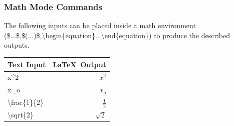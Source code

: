 \documentclass{beamer}
\begin{document}
\begin{frame}
	\frametitle{Math Mode Commands}
The following inputs can be placed inside a math environment (\$...\$,\$(...)\$,\textbackslash begin\{equation\}...\textbackslash end\{equation\}) to produce the described outputs.
\begin{center}
	\begin{tabular}{ l r }
		Text Input & \LaTeX\ Output\\
		\hline
		x\^{}2 & $x^{2}$ \\ 
		x\_o & $x_o$ \\ 
		\textbackslash frac\{1\}\{2\} & $\frac{1}{2}$ \\ 
		\textbackslash sqrt\{2\} & $\sqrt{2}$ \\ 
	\end{tabular}
\end{center}
\end{frame}
\end{document}

